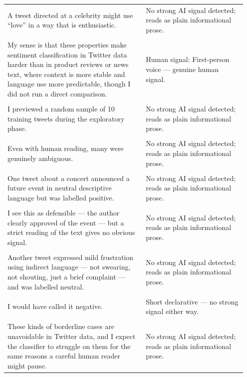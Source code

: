\documentclass[11pt]{article}
\begin{document}
\begin{longtable}{|p{0.55\linewidth}|p{0.40\linewidth}|}
\hline
\rule{0pt}{3.5cm} & \\
\hline
A tweet directed at a celebrity might use ``love'' in a way that is enthusiastic. & No strong AI signal detected; reads as plain informational prose. \\[2pt]
\hline
\rule{0pt}{3.5cm} & \\
\hline
My sense is that these properties make sentiment classification in Twitter data harder than in product reviews or news text, where context is more stable and language use more predictable, though I did not run a direct comparison. & Human signal: First-person voice --- genuine human signal. \\[2pt]
\hline
\rule{0pt}{3.5cm} & \\
\hline
I previewed a random sample of 10 training tweets during the exploratory phase. & No strong AI signal detected; reads as plain informational prose. \\[2pt]
\hline
\rule{0pt}{3.5cm} & \\
\hline
Even with human reading, many were genuinely ambiguous. & No strong AI signal detected; reads as plain informational prose. \\[2pt]
\hline
\rule{0pt}{3.5cm} & \\
\hline
One tweet about a concert announced a future event in neutral descriptive language but was labelled positive. & No strong AI signal detected; reads as plain informational prose. \\[2pt]
\hline
\rule{0pt}{3.5cm} & \\
\hline
I see this as defensible --- the author clearly approved of the event --- but a strict reading of the text gives no obvious signal. & No strong AI signal detected; reads as plain informational prose. \\[2pt]
\hline
\rule{0pt}{3.5cm} & \\
\hline
Another tweet expressed mild frustration using indirect language --- not swearing, not shouting, just a brief complaint --- and was labelled neutral. & No strong AI signal detected; reads as plain informational prose. \\[2pt]
\hline
\rule{0pt}{3.5cm} & \\
\hline
I would have called it negative. & Short declarative --- no strong signal either way. \\[2pt]
\hline
\rule{0pt}{3.5cm} & \\
\hline
These kinds of borderline cases are unavoidable in Twitter data, and I expect the classifier to struggle on them for the same reasons a careful human reader might pause. & No strong AI signal detected; reads as plain informational prose. \\[2pt]

\end{longtable}
\end{document}
